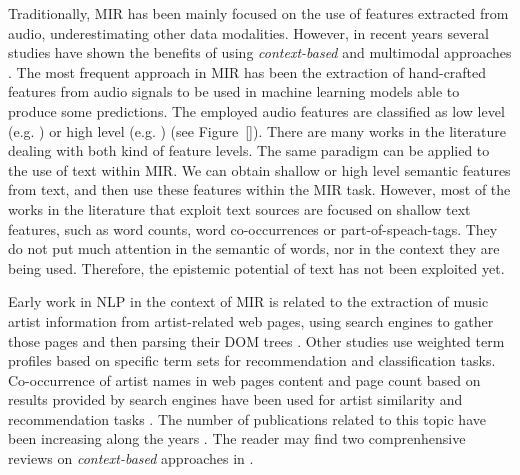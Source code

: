 Traditionally, MIR has been mainly focused on the use of features extracted from audio, underestimating other data modalities. However, in recent years several studies have shown the benefits of using \textit{context-based} and multimodal approaches \cite{Schedl2014}. The most frequent approach in MIR has been the extraction of hand-crafted features from audio signals to be used in machine learning models able to produce some predictions. The employed audio features are classified as low level (e.g. ) or high level (e.g. ) (see Figure~\ref{}). There are many works in the literature dealing with both kind of feature levels. The same paradigm can be applied to the use of text within MIR. We can obtain shallow or high level semantic features from text, and then use these features within the MIR task. However, most of the works in the literature that exploit text sources are focused on shallow text features, such as word counts, word co-occurrences or part-of-speach-tags. They do not put much attention in the semantic of words, nor in the context they are being used. Therefore, the epistemic potential of text has not been exploited yet.

Early work in NLP in the context of MIR is related to the extraction of music artist information from artist-related web pages, using search engines to gather those pages and then parsing their DOM trees \cite{Cohen2000}. Other studies \cite{Ellis2002} \cite{Whitman2002} use weighted term profiles based on specific term sets for recommendation and classification tasks. Co-occurrence of artist names in web pages content and page count based on results provided by search engines have been used for artist similarity and recommendation tasks \cite{Schedl2005}. The number of publications related to this topic have been increasing along the years \cite{}. The reader may find two comprenhensive reviews on \textit{context-based} approaches in \cite{Knees2013, Schedl2014}.


